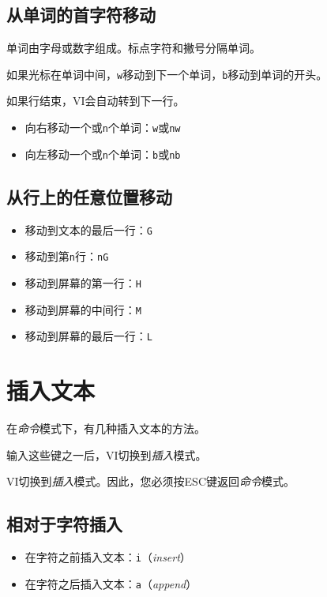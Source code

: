 \documentclass[12pt,a4paper,twoside]{ctexbook}
\newenvironment{note}{
    \begin{center}
    \fbox{\parbox{0.9\linewidth}{
        \vspace{0.5em}
        \textbf{注意：}
        \vspace{0.5em}
    }}
    \end{center}
}{
}
\begin{document}
\subsection{从单词的首字符移动}

单词由字母或数字组成。标点字符和撇号分隔单词。

如果光标在单词中间，\texttt{w}移动到下一个单词，\texttt{b}移动到单词的开头。

如果行结束，VI会自动转到下一行。

\begin{itemize}
    \item 向右移动一个或\texttt{n}个单词：\texttt{w}或\texttt{nw}
    \item 向左移动一个或\texttt{n}个单词：\texttt{b}或\texttt{nb}
\end{itemize}

\subsection{从行上的任意位置移动}

\begin{itemize}
    \item 移动到文本的最后一行：\texttt{G}
    \item 移动到第\texttt{n}行：\texttt{nG}
    \item 移动到屏幕的第一行：\texttt{H}
    \item 移动到屏幕的中间行：\texttt{M}
    \item 移动到屏幕的最后一行：\texttt{L}
\end{itemize}

\section{插入文本}

在\textit{命令}模式下，有几种插入文本的方法。

输入这些键之一后，VI切换到\textit{插入}模式。

\begin{note}
VI切换到\textit{插入}模式。因此，您必须按ESC键返回\textit{命令}模式。
\end{note}

\subsection{相对于字符插入}

\begin{itemize}
    \item 在字符之前插入文本：\texttt{i}（\textit{insert}）
    \item 在字符之后插入文本：\texttt{a}（\textit{append}）
\end{itemize}
\end{document}
